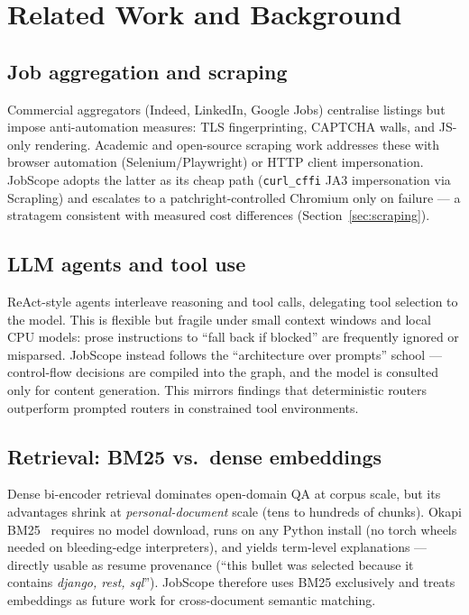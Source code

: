 \documentclass[11pt,a4paper]{article}
\newcommand{\code}[1]{\texttt{#1}}
\begin{document}
\section{Related Work and Background}
\label{sec:related}

\subsection{Job aggregation and scraping}
Commercial aggregators (Indeed, LinkedIn, Google Jobs) centralise listings
but impose anti-automation measures: TLS fingerprinting, CAPTCHA walls, and
JS-only rendering. Academic and open-source scraping work addresses these
with browser automation (Selenium/Playwright) or HTTP client impersonation.
JobScope adopts the latter as its cheap path (\code{curl\_cffi} JA3
impersonation via Scrapling) and escalates to a patchright-controlled
Chromium only on failure --- a stratagem consistent with measured cost
differences (Section~\ref{sec:scraping}).

\subsection{LLM agents and tool use}
ReAct-style agents interleave reasoning and tool calls, delegating tool
selection to the model. This is flexible but fragile under small context
windows and local CPU models: prose instructions to ``fall back if blocked''
are frequently ignored or misparsed. JobScope instead follows the
``architecture over prompts'' school --- control-flow decisions are compiled
into the graph, and the model is consulted only for content generation. This
mirrors findings that deterministic routers outperform prompted routers in
constrained tool environments.

\subsection{Retrieval: BM25 vs.\ dense embeddings}
Dense bi-encoder retrieval dominates open-domain QA at corpus scale, but
its advantages shrink at \emph{personal-document} scale (tens to hundreds of
chunks). Okapi BM25~\cite{robertson2009} requires no model download, runs on
any Python install (no torch wheels needed on bleeding-edge interpreters),
and yields term-level explanations --- directly usable as resume provenance
(``this bullet was selected because it contains \textit{django, rest,
sql}''). JobScope therefore uses BM25 exclusively and treats embeddings as
future work for cross-document semantic matching.
\end{document}
